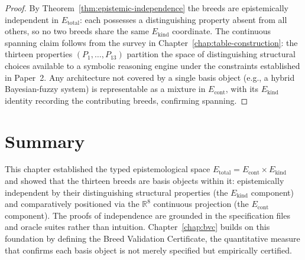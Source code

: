 \begin{proof}
By Theorem~\ref{thm:epistemic-independence} the breeds are epistemically independent in
$E_{\text{total}}$: each possesses a distinguishing property absent from all others, so
no two breeds share the same $E_{\text{kind}}$ coordinate. The continuous spanning claim
follows from the survey in Chapter~\ref{chap:table-construction}: the thirteen properties
$(P_1, \ldots, P_{13})$ partition the space of distinguishing structural choices available
to a symbolic reasoning engine under the constraints established in Paper~2. Any
architecture not covered by a single basis object (e.g., a hybrid Bayesian-fuzzy system)
is representable as a mixture in $E_{\text{cont}}$, with its $E_{\text{kind}}$ identity
recording the contributing breeds, confirming spanning.
\end{proof}

\section{Summary}
\label{sec:epistemological-space-summary}

This chapter established the typed epistemological space
$E_{\text{total}} = E_{\text{cont}} \times E_{\text{kind}}$ and showed that the thirteen
breeds are basis objects within it: epistemically independent by their distinguishing
structural properties (the $E_{\text{kind}}$ component) and comparatively positioned via
the $\mathbb{R}^8$ continuous projection (the $E_{\text{cont}}$ component). The proofs of
independence are grounded in the specification files and oracle suites rather than
intuition. Chapter~\ref{chap:bvc} builds on this foundation by defining the Breed
Validation Certificate, the quantitative measure that confirms each basis object is not
merely specified but empirically certified.
